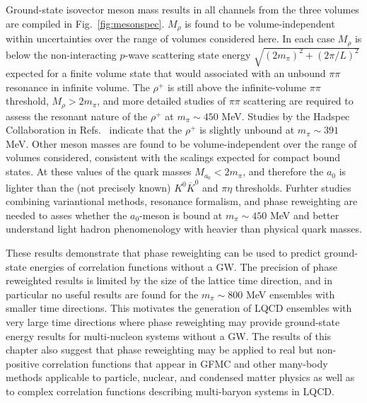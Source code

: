 Ground-state isovector meson mass results in all channels from the three volumes are compiled in Fig.~\ref{fig:mesonspec}.
$M_\rho$ is found to be volume-independent within uncertainties over the range of volumes considered here.
In each case $M_\rho$ is below the non-interacting $p$-wave scattering state energy $\sqrt{ (2m_\pi)^2 + (2\pi/L)^2}$ expected for a finite volume state that would associated with an unbound $\pi\pi$ resonance in infinite volume.
The $\rho^+$ is still above the infinite-volume $\pi\pi$ threshold, $M_\rho > 2m_\pi$, and more detailed studies of $\pi\pi$ scattering are required to assess the resonant nature of the $\rho^+$ at $m_\pi \sim 450$ MeV.
Studies by the Hadspec Collaboration in Refs.~\cite{Dudek:2012gj,Dudek:2012xn}
indicate that the $\rho^+$ is slightly unbound at $m_\pi \sim 391$ MeV.
Other meson masses are found to be volume-independent over the range of volumes considered, consistent with the scalings expected for compact bound states.
At these values of the quark masses $M_{a_0} < 2m_\pi$, and therefore the $a_0$ is lighter than the (not precisely known) $K^0\overline{K}^0$ and $\pi\eta$ thresholds.
Furhter studies combining variantional methods, resonance formalism, and phase reweighting are needed
to asses whether the $a_0$-meson is bound at $m_\pi \sim 450$ MeV and better understand light hadron phenomenology with heavier than physical quark masses.


These results demonstrate that phase reweighting can be used to predict ground-state energies of correlation functions without a GW.
The precision of phase reweighted results is limited by the size of the lattice time direction, and in particular no useful results are found for the $m_\pi \sim 800$ MeV ensembles with smaller time directions.
This motivates the generation of LQCD ensembles with very large time directions
where phase reweighting may provide ground-state energy results
for multi-nucleon systems without a GW.
The results of this chapter also suggest that phase reweighting may be applied to real but non-positive correlation functions that appear in GFMC and other many-body methods applicable to particle, nuclear, and condensed matter physics as well as to complex correlation functions describing multi-baryon systems in LQCD.


